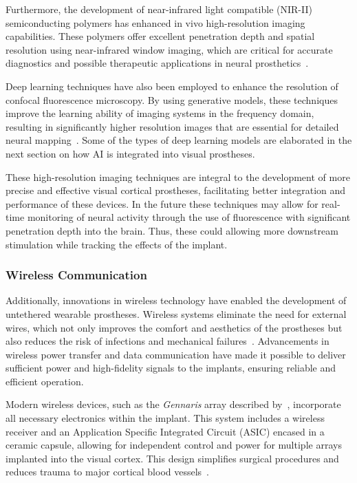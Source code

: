 \documentclass[twocolumn,10pt]{article}
\begin{document}
Furthermore, the development of near-infrared light compatible (NIR-II)
semiconducting polymers has enhanced in vivo high-resolution imaging
capabilities. These polymers offer excellent penetration depth and spatial
resolution using near-infrared window imaging, which are critical for accurate
diagnostics and possible therapeutic applications in neural
prosthetics~\parencite{wangRecentProgressSecond2023,kangNIRIISemiconductingPolymers2023}.

Deep learning techniques have also been employed to enhance the resolution of
confocal fluorescence microscopy. By using generative models, these techniques
improve the learning ability of imaging systems in the frequency domain,
resulting in significantly higher resolution images that are essential for
detailed neural mapping~\parencite{huangEnhancingImageResolution2023}. Some of
the types of deep learning models are elaborated in the next section on how AI
is integrated into visual prostheses.

These high-resolution imaging techniques are integral to the development of more
precise and effective visual cortical prostheses, facilitating better
integration and performance of these devices. In the future these techniques may
allow for real-time monitoring of neural activity through the use of
fluorescence with significant penetration depth into the brain. Thus, these
could allowing more downstream stimulation while tracking the effects of the
implant.

\subsubsection*{Wireless Communication}
Additionally, innovations in wireless technology have enabled the development of
untethered wearable prostheses. Wireless systems eliminate the need for external
wires, which not only improves the comfort and aesthetics of the prostheses but
also reduces the risk of infections and mechanical
failures~\parencite{bruntonOptimisingElectrodeSurface2013}. Advancements in
wireless power transfer and data communication have made it possible to deliver
sufficient power and high-fidelity signals to the implants, ensuring reliable
and efficient operation.

Modern wireless devices, such as the \textit{Gennaris} array described
by~\textcite{rosenfeldTissueResponseChronically2020}, incorporate all necessary
electronics within the implant. This system includes a wireless receiver and an
Application Specific Integrated Circuit (ASIC) encased in a ceramic capsule,
allowing for independent control and power for multiple arrays implanted into
the visual cortex. This design simplifies surgical procedures and reduces trauma
to major cortical blood vessels~\parencite{polikovResponseBrainTissue2005}.
\end{document}
